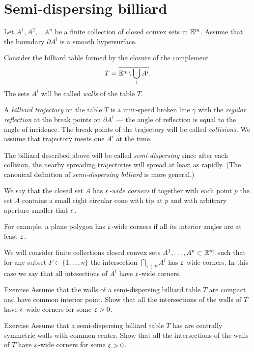 \section{Semi-dispersing billiard}

Let $A^1,A^2,\dots A^n$ be a finite collection of closed convex sets in $\mathbb{E}^m$.
Assume that the boundary $\partial A^i$ is a smooth hypersurface.

Consider the billiard table formed by the closure of the complement 
$$T=\overline{\mathbb{E}^m\backslash \bigcup_{i} A^i}.$$
The sets $A^i$ will be called \emph{walls} of the table $T$.

A \emph{billiard trajectory} 
on the table $T$ is a unit-speed broken line $\gamma$
with the \emph{regular reflection} at the break points on $\partial A^i$ 
--- the angle of reflection is equal to the angle of incidence.
The break points of the trajectory will be called \emph{collisions}.
We assume that trajectory meets one $A^i$ at the time.

The billiard described above will be called \emph{semi-dispersing} since after each collision, the nearby spreading trajectories will spread at least as rapidly.
(The canonical definition of  \emph{semi-dispersing billiard} is more general.)

We say that the closed set $A$ has  \emph{$\upvarepsilon$-wide corners} 
if together with each point $p$
the set $A$ contains a small right circular cone
with tip at $p$ and
with arbitrary aperture smaller that $\upvarepsilon$.

For example, 
a plane polygon 
has $\upvarepsilon$-wide corners
if all its interior angles are at least $\upvarepsilon$.

We will consider finite collections closed convex sets 
$A^1,\dots,A^n\subset\RR^m$ 
such that for any subset $F\subset\{1,\dots,n\}$
the intersection
$\bigcap_{i\in F}A^i$ 
has $\upvarepsilon$-wide corners.
In this case we say that all intesections of $A^i$ have $\upvarepsilon$-wide corners.

\begin{thm}{Exercise}
Assume that the walls
of a semi-dispersing billiard table $T$ 
are compact and have common interior point.
Show that all the intersections of the walls of $T$ have $\upvarepsilon$-wide corners for some $\upvarepsilon>0$.
\end{thm}

\begin{thm}{Exercise}\label{ex:centrally-simmetric-walls}
Assume that a semi-dispersing billiard table $T$ has
are centrally symmetric walls with common center.
Show that all the intersections of the walls of $T$  have $\upvarepsilon$-wide corners for some $\upvarepsilon>0$.
\end{thm}

